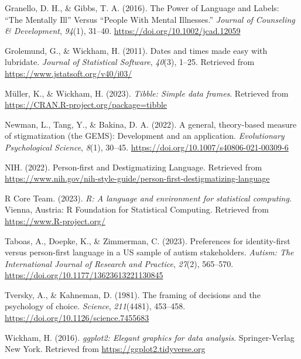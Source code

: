 \documentclass[
  man]{apa6}
\newlength{\cslhangindent}
\newlength{\cslentryspacingunit} %
\newenvironment{CSLReferences}[2] %
 {%
  \setlength{\parindent}{0pt}
  \ifodd #1
  \let\oldpar\par
  \def\par{\hangindent=\cslhangindent\oldpar}
  \fi
  \setlength{\parskip}{#2\cslentryspacingunit}
 }%
 {}
\begin{document}
\begin{CSLReferences}{1}{0}
\leavevmode{}%
Granello, D. H., \& Gibbs, T. A. (2016). The {Power} of {Language} and {Labels}: {``{The} {Mentally} {Ill}''} {Versus} {``{People} {With} {Mental} {Illnesses}.''} \emph{Journal of Counseling \& Development}, \emph{94}(1), 31--40. \url{https://doi.org/10.1002/jcad.12059}

\leavevmode{}%
Grolemund, G., \& Wickham, H. (2011). Dates and times made easy with {lubridate}. \emph{Journal of Statistical Software}, \emph{40}(3), 1--25. Retrieved from \url{https://www.jstatsoft.org/v40/i03/}

\leavevmode{}%
Müller, K., \& Wickham, H. (2023). \emph{Tibble: Simple data frames}. Retrieved from \url{https://CRAN.R-project.org/package=tibble}

\leavevmode{}%
Newman, L., Tang, Y., \& Bakina, D. A. (2022). A general, theory-based measure of stigmatization (the {GEMS}): {Development} and an application. \emph{Evolutionary Psychological Science}, \emph{8}(1), 30--45. \url{https://doi.org/10.1007/s40806-021-00309-6}

\leavevmode{}%
NIH. (2022). Person-first and {Destigmatizing} {Language}. Retrieved from \url{https://www.nih.gov/nih-style-guide/person-first-destigmatizing-language}

\leavevmode{}%
R Core Team. (2023). \emph{R: A language and environment for statistical computing}. Vienna, Austria: R Foundation for Statistical Computing. Retrieved from \url{https://www.R-project.org/}

\leavevmode{}%
Taboas, A., Doepke, K., \& Zimmerman, C. (2023). Preferences for identity-first versus person-first language in a {US} sample of autism stakeholders. \emph{Autism: The International Journal of Research and Practice}, \emph{27}(2), 565--570. \url{https://doi.org/10.1177/13623613221130845}

\leavevmode{}%
Tversky, A., \& Kahneman, D. (1981). The framing of decisions and the psychology of choice. \emph{Science}, \emph{211}(4481), 453--458. \url{https://doi.org/10.1126/science.7455683}

\leavevmode{}%
Wickham, H. (2016). \emph{ggplot2: Elegant graphics for data analysis}. Springer-Verlag New York. Retrieved from \url{https://ggplot2.tidyverse.org}


\end{CSLReferences}
\end{document}
